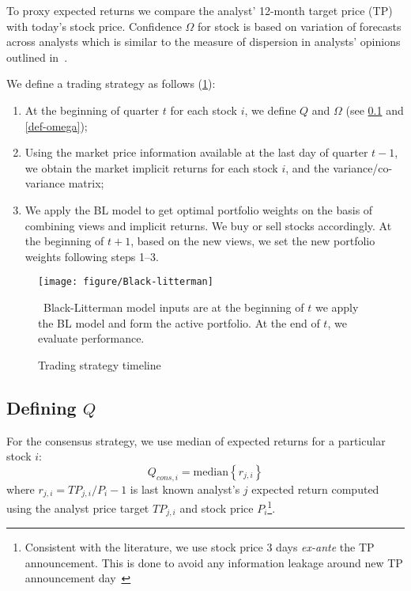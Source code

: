 \documentclass[a4paper,twoside,12pt,openright,notitlepage]{report}\usepackage[]{graphicx}\usepackage[]{color}
\begin{document}
To proxy expected returns we compare the analyst' 12-month target price (TP) with today's stock price. Confidence $\Omega$ for stock is based on variation  of forecasts across analysts which is similar to the measure of dispersion in analysts' opinions outlined in~\cite{diether2002}.


We define a trading strategy as follows (\ref{fig:bl}):
\begin{enumerate}
\item  At the beginning of quarter $t$ for each stock $i$,   we define $Q$ and $\Omega$ (see \ref{def-q} and \ref{def-omega});

\item Using the market price information available at the last day of quarter $t-1$, we obtain the market implicit returns for each stock $i$,  and the variance/co-variance matrix;

\item We apply the BL model to get  optimal portfolio weights on the basis of combining views and implicit returns. We  buy or sell stocks accordingly. At the beginning of $t+1$, based on the new views, we set the new portfolio weights following  steps 1--3.
\end{enumerate}


\begin{figure}
\begin{center}
\texttt{[image: figure/Black-litterman]}
\end{center}
\caption{Trading strategy timeline}
\label{fig:bl}
\ Black-Litterman model inputs are at the beginning of $t$ we apply the BL model and form the active portfolio. At the end of $t$, we evaluate performance.
\end{figure}


\subsection{Defining $Q$}
\label{def-q}

For the consensus strategy, we use median of expected returns for a particular stock $i$:
\begin{equation}
\label{consq}
Q_{cons,i}= \mathrm{median} \left\{r_{j,i}\right\}
\end{equation}
where $r_{j,i}=TP_{j,i}/P_{i}-1$  is last known analyst's $j$ expected return computed using the analyst price target $TP_{j,i}$ and stock price $P_{i}$\footnote{Consistent with the literature, we use stock price 3 days \emph{ex-ante} the TP announcement. This is done to avoid any information leakage around new TP announcement day~\citep{bonini2010}}.
\end{document}
